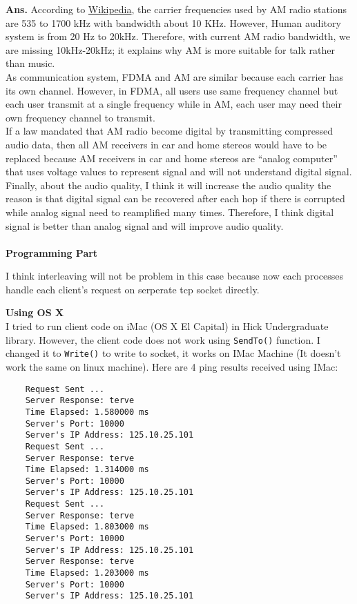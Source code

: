 \documentclass[12pt]{article}
\newenvironment{problem}[2][Problem]{\begin{trivlist}
\item[\hskip \labelsep {\bfseries #1}\hskip \labelsep {\bfseries #2.}]}{\end{trivlist}}
\begin{document}
\begin{problem}{3}
\end{problem}
\textbf{Ans.} According to \href{https://en.wikipedia.org/wiki/Broadcast_band}{Wikipedia}, the carrier frequencies used by AM radio stations are 535 to 1700 kHz with bandwidth about 10 KHz. However, Human auditory system is from 20 Hz to 20kHz. Therefore, with current AM radio bandwidth, we are missing 10kHz-20kHz; it explains why AM is more suitable for talk rather than music. \\
As communication system, FDMA and AM are similar because each carrier has its own channel. However, in FDMA, all users use same frequency channel but each user transmit at a single frequency while in AM, each user may need their own frequency channel to transmit. \\
If a  law  mandated  that  AM  radio  become  digital  by  transmitting compressed  audio  data, then all AM receivers in car and home stereos would have to be replaced because AM receivers in car and home stereos are ``analog computer'' that uses voltage values to represent signal and will not understand digital signal. \\ 
Finally, about the audio quality, I think it will increase the audio quality the reason is that digital signal can be recovered after each hop if there is corrupted while analog signal need to reamplified many times. Therefore, I think digital signal is better than analog signal and will improve audio quality.\\\\
\Large{\textbf{Programming Part}}
\normalsize
\begin{problem}{1}
\end{problem}
I think interleaving will not be problem in this case because now each processes handle each client's request on serperate tcp socket directly.   
\begin{problem}{Bonus}
\end{problem}
\textbf{Using OS X} \\
I tried to run client code on iMac (OS X El Capital) in Hick Undergraduate library. However, the client code does not work using \texttt{SendTo()} function. I changed it to \texttt{Write()} to write to socket, it works on IMac Machine (It doesn't work the same on linux machine). Here are 4 ping results received using IMac:
\begin{verbatim}
	Request Sent ...
	Server Response: terve
	Time Elapsed: 1.580000 ms
	Server's Port: 10000
	Server's IP Address: 125.10.25.101
	Request Sent ...
	Server Response: terve
	Time Elapsed: 1.314000 ms
	Server's Port: 10000
	Server's IP Address: 125.10.25.101
	Request Sent ...
	Server Response: terve
	Time Elapsed: 1.803000 ms
	Server's Port: 10000
	Server's IP Address: 125.10.25.101
	Server Response: terve
	Time Elapsed: 1.203000 ms
	Server's Port: 10000
	Server's IP Address: 125.10.25.101
\end{verbatim}
\end{document}

